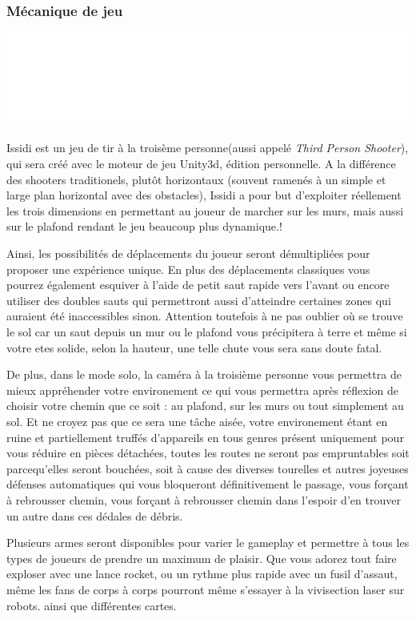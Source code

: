 ﻿\documentclass{article}
\begin{document}
\newpage\subsubsection{Mécanique de jeu}
\centerline{\includegraphics[scale=0.2]{latex_sa_pue.png}}
 Issidi est un jeu de tir à la troisème personne(aussi appelé \emph{Third Person Shooter}),
qui sera créé avec le moteur de jeu Unity3d, édition personnelle.
A la différence des shooters traditionels,
plutôt horizontaux (souvent ramenés à un simple et large
plan horizontal avec des obstacles),
Issidi a pour but d'exploiter réellement les trois dimensions en permettant au
joueur de marcher sur les murs, mais aussi sur le plafond rendant le jeu beaucoup plus dynamique.!

Ainsi, les possibilités de déplacements du joueur seront démultipliées pour proposer une expérience unique. 
En plus des déplacements classiques vous pourrez également esquiver à l'aide de petit saut rapide vers 
l'avant ou encore utiliser des doubles sauts qui permettront aussi d'atteindre certaines zones qui auraient
 été inaccessibles sinon. Attention toutefois à ne pas oublier où se trouve le sol car un saut depuis un mur 
ou le plafond vous précipitera à terre et même si votre etes solide, selon la hauteur, une telle chute vous 
sera sans doute fatal.


De plus, dans le mode solo, la caméra à la troisième personne vous permettra de mieux appréhender votre 
environement ce qui vous permettra après réflexion de choisir votre chemin que ce soit : au plafond, 
sur les murs ou tout simplement au sol. Et ne croyez pas que ce sera une tâche aisée, votre environement 
étant en ruine et partiellement truffés d'appareils en tous genres présent uniquement pour vous réduire en 
pièces détachées, toutes les routes ne seront pas empruntables soit parcequ'elles seront bouchées, soit à cause 
des diverses tourelles et autres joyeuses défenses automatiques qui vous bloqueront définitivement le passage, vous 
forçant à rebrousser chemin, vous forçant à rebrousser chemin dans l'espoir d'en trouver un autre dans ces dédales de débris.

Plusieurs armes seront disponibles pour varier le gameplay et permettre à tous les types de joueurs de prendre
 un maximum de plaisir. Que vous adorez tout faire exploser avec une lance rocket, ou un rythme plus rapide avec 
un fusil d'assaut, même les fans de corps à corps pourront même s'essayer à la vivisection laser sur robots. 
ainsi que différentes cartes.
\end{document}
